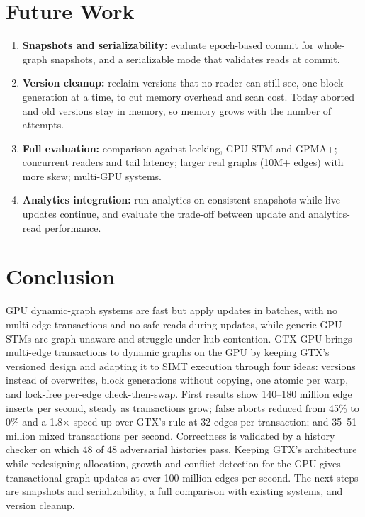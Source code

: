 \documentclass[11pt,a4paper,oneside]{report}
\newcommand{\sys}{GTX-GPU}
\begin{document}
\section{Future Work}
\begin{enumerate}
\item \textbf{Snapshots and serializability:} evaluate epoch-based commit for whole-graph snapshots, and a serializable
  mode that validates reads at commit.
\item \textbf{Version cleanup:} reclaim versions that no reader can still see, one block generation at a time, to cut
  memory overhead and scan cost. Today aborted and old versions stay in memory, so memory grows with the number of
  attempts.
\item \textbf{Full evaluation:} comparison against locking, GPU STM and GPMA+; concurrent readers and tail latency;
  larger real graphs (10M+ edges) with more skew; multi-GPU systems.
\item \textbf{Analytics integration:} run analytics on consistent snapshots while live updates continue, and evaluate
  the trade-off between update and analytics-read performance.
\end{enumerate}

\section{Conclusion}
GPU dynamic-graph systems are fast but apply updates in batches, with no multi-edge transactions and no safe reads
during updates, while generic GPU STMs are graph-unaware and struggle under hub contention. \sys{} brings multi-edge
transactions to dynamic graphs on the GPU by keeping GTX's versioned design and adapting it to SIMT execution through
four ideas: versions instead of overwrites, block generations without copying, one atomic per warp, and lock-free
per-edge check-then-swap. First results show 140--180 million edge inserts per second, steady as transactions grow;
false aborts reduced from 45\% to 0\% and a 1.8$\times$ speed-up over GTX's rule at 32 edges per transaction; and 35--51
million mixed transactions per second. Correctness is validated by a history checker on which 48 of 48 adversarial
histories pass. Keeping GTX's architecture while redesigning allocation, growth and conflict detection for the GPU gives
transactional graph updates at over 100 million edges per second. The next steps are snapshots and serializability, a
full comparison with existing systems, and version cleanup.

\begin{singlespace}
\printbibliography[heading=thesis]
\end{singlespace}
\end{document}
